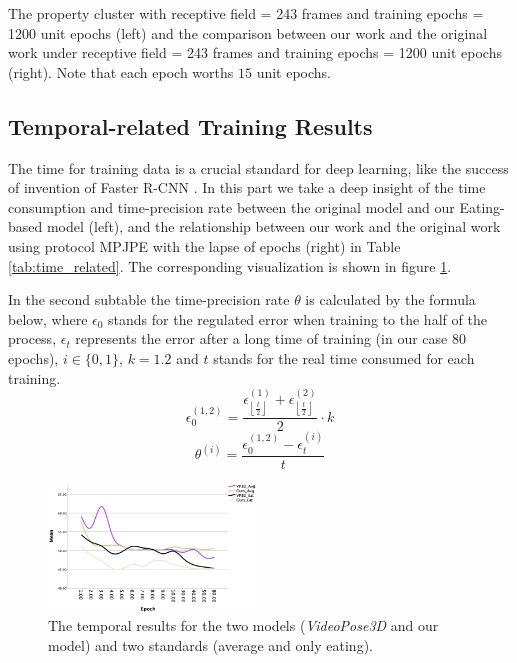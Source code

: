 \documentclass[10pt,twocolumn,letterpaper]{article}
\begin{document}
\begin{table}
\caption{The property cluster with receptive field = 243 frames and training epochs = 1200 unit epochs (left) and the 
comparison between our work and the original work under receptive field = 243 frames and training epochs = 1200 unit epochs
(right). Note that each epoch worths $15$ unit epochs.}
\label{tab:time_related}
\end{table}

\clearpage
\newpage
\subsection{Temporal-related Training Results}

The time for training data is a crucial standard for deep learning, like the success of invention of Faster R-CNN
\cite{Ren2015}. In this part we take a deep insight of the time consumption and time-precision rate between the 
original model and our Eating-based model (left), and the relationship between our work 
and the original work using protocol MPJPE with the lapse of epochs (right) in Table \ref{tab:time_related}. The 
corresponding visualization is shown in figure \ref{fig:temporal_figure}.

In the second subtable the time-precision rate $\theta$ is calculated by the formula below, where $\epsilon_0$ stands
for the regulated error when training to the half of the process, $\epsilon_t$ represents the error 
after a long time of training (in our case 80 epochs), $i\in\{0,1\}$, $k=1.2$ and $t$ stands for the real time consumed for each training.
\begin{equation}
		\epsilon_0^{(1,2)}=\frac{\epsilon_{\left\lfloor\frac{t}{2}\right\rfloor}^{(1)}+\epsilon_{\left\lfloor\frac{t}{2}\right\rfloor}^{(2)}}{2}\cdot k
\end{equation}
\begin{equation}
	\theta^{(i)} = \frac{\epsilon_0^{(1,2)} - \epsilon_t^{(i)}}{t}
\end{equation}


\begin{figure}[H]
    \centering
    \includegraphics[width=0.49\textwidth]{MPJPE_epoch.png}
	\caption{The temporal results for the two models (\textit{VideoPose3D} and our model) and two standards (average and only eating).}
	\label{fig:temporal_figure}
\end{figure}
\end{document}
